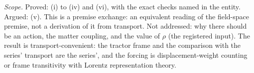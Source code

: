 \emph{Scope.} Proved: (i) to (iv) and (vi), with the exact checks named in the entity. Argued: (v). This is a premise exchange: an equivalent reading of the field-space premise, not a derivation of it from transport. Not addressed: why there should be an action, the matter coupling, and the value of $\rho$ (the registered input). The result is transport-convenient: the tractor frame and the comparison with the series' transport are the series', and the forcing is displacement-weight counting or frame transitivity with Lorentz representation theory.

